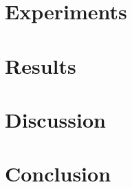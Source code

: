 \documentclass[fleqn]{IOS-Book-Article}
\begin{document}


\section{Experiments} \label{sec:experiments}



\section{Results} \label{sec:results}



\section{Discussion}


\section{Conclusion} \label{sec:conclusion}




\newpage



%




 


\end{document}

